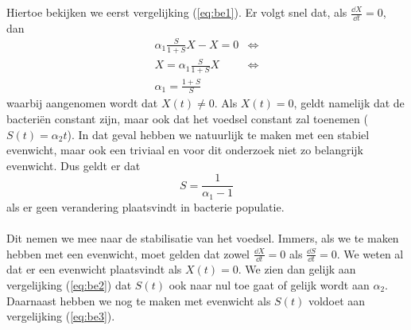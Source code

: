 Hiertoe bekijken we eerst vergelijking (\ref{eq:be1}). Er volgt snel dat, als $\tfrac{\dd X}{\dd t} = 0$, dan
\begin{align*}
	\alpha_1 \frac{S}{1 + S} X - X = 0 &\iff \\
	X = \alpha_1 \frac{S}{1 + S}X &\iff \\
	\alpha_1 = \frac{1 + S}{S}
\end{align*}
waarbij aangenomen wordt dat $X(t) \not = 0$. Als $X(t) = 0$, geldt namelijk dat de bacteri\"en constant zijn, maar ook dat het voedsel constant zal toenemen ($S(t) = \alpha_2 t$). In dat geval hebben we natuurlijk te maken met een stabiel evenwicht, maar ook een triviaal en voor dit onderzoek niet zo belangrijk evenwicht. Dus geldt er dat
\begin{equation}
	S = \frac{1}{\alpha_1 - 1}								\label{eq:be3}
\end{equation}
als er geen verandering plaatsvindt in bacterie populatie. 
\\
\\
Dit nemen we mee naar de stabilisatie van het voedsel. Immers, als we te maken hebben met een evenwicht, moet gelden dat zowel $\tfrac{\dd X}{\dd t} = 0$ als $\tfrac{\dd S}{ \dd t } = 0$. We weten al dat er een evenwicht plaatsvindt als $X(t) = 0$. We zien dan gelijk aan vergelijking (\ref{eq:be2}) dat $S(t)$ ook naar nul toe gaat of gelijk wordt aan $\alpha_2$. Daarnaast hebben we nog te maken met evenwicht als $S(t)$ voldoet aan vergelijking (\ref{eq:be3}). 

